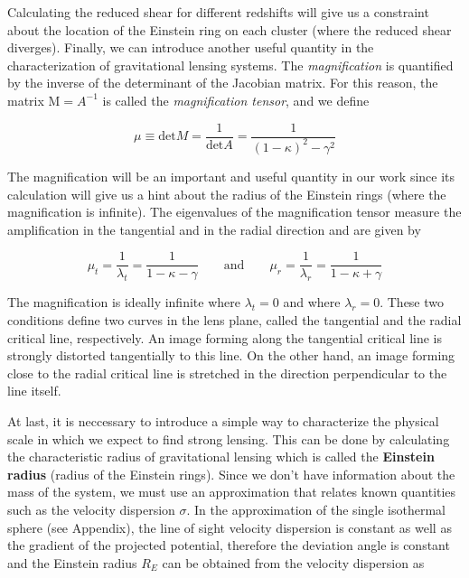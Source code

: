 Calculating the reduced shear for different redshifts will give us a constraint about the location of the Einstein ring on each cluster (where the reduced shear diverges). Finally, we can introduce another useful quantity in the characterization of gravitational lensing systems. The \textit{magnification} is quantified by the inverse of the determinant of the Jacobian matrix. For this reason, the matrix $\text{M}=A^{-1}$ is called the \textit{magnification tensor}, and we define

\begin{equation}
\mu \equiv \text{det} M = \frac{1}{\text{det}A}=\frac{1}{(1-\kappa)^2-\gamma^2}
\end{equation}

The magnification will be an important and useful quantity in our work since its calculation will give us a hint about the radius of the Einstein rings (where the magnification is infinite). The eigenvalues of the magnification tensor measure the amplification in the tangential and in the radial direction and are given by

\begin{equation}
\mu_t = \frac{1}{\lambda_t}=\frac{1}{1-\kappa - \gamma} \qquad \text{and} \qquad  \mu_r = \frac{1}{\lambda_r}=\frac{1}{1-\kappa + \gamma}
\end{equation}

The magnification is ideally infinite where $\lambda_t=0$ and where $\lambda_r=0$. These two conditions define two curves in the lens plane, called the tangential and the radial critical line, respectively. An image forming along the tangential critical line is strongly distorted tangentially to this line. On the other hand, an image forming close to the radial critical line is stretched in the direction perpendicular to the line itself. 

At last, it is neccessary to introduce a simple way to characterize the physical scale in which we expect to find strong lensing. This can be done by calculating the characteristic radius of gravitational lensing which is called the \textbf{Einstein radius} (radius of the Einstein rings). Since we don't have information about the mass of the system, we must use an approximation that relates known quantities such as the velocity dispersion $\sigma$. In the approximation of the single isothermal sphere (see Appendix), the line of sight velocity dispersion is constant as well as the gradient of the projected potential, therefore the deviation angle is constant and the Einstein radius $R_{E}$ can be obtained from the velocity dispersion as

